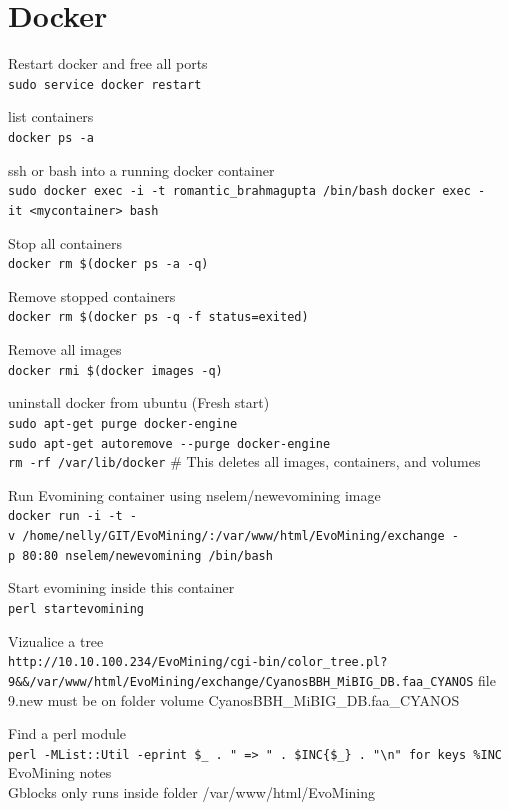 \documentclass[12pt,twoside]{reedthesis}
\begin{document}
  \section{Docker}\label{docker}
  
  Restart docker and free all ports\\
  \texttt{sudo\ service\ docker\ restart}
  
  list containers\\
  \texttt{docker\ ps\ -a}
  
  ssh or bash into a running docker container\\
  \texttt{sudo\ docker\ exec\ -i\ -t\ romantic\_brahmagupta\ /bin/bash}
  \texttt{docker\ exec\ -it\ \textless{}mycontainer\textgreater{}\ bash}
  
  Stop all containers\\
  \texttt{docker\ rm\ \$(docker\ ps\ -a\ -q)}
  
  Remove stopped containers\\
  \texttt{docker\ rm\ \$(docker\ ps\ -q\ -f\ status=exited)}
  
  Remove all images\\
  \texttt{docker\ rmi\ \$(docker\ images\ -q)}
  
  uninstall docker from ubuntu (Fresh start)\\
  \texttt{sudo\ apt-get\ purge\ docker-engine}\\
  \texttt{sudo\ apt-get\ autoremove\ -\/-purge\ docker-engine}\\
  \texttt{rm\ -rf\ /var/lib/docker} \# This deletes all images,
  containers, and volumes
  
  Run Evomining container using nselem/newevomining image\\
  \texttt{docker\ run\ -i\ -t\ -v\ /home/nelly/GIT/EvoMining/:/var/www/html/EvoMining/exchange\ -p\ 80:80\ nselem/newevomining\ /bin/bash}
  
  Start evomining inside this container\\
  \texttt{perl\ startevomining}
  
  Vizualice a tree\\
  \texttt{http://10.10.100.234/EvoMining/cgi-bin/color\_tree.pl?9\&\&/var/www/html/EvoMining/exchange/CyanosBBH\_MiBIG\_DB.faa\_CYANOS}
  file 9.new must be on folder volume CyanosBBH\_MiBIG\_DB.faa\_CYANOS
  
  Find a perl module\\
  \texttt{perl\ -MList::Util\ -e\textquotesingle{}print\ \$\_\ .\ "\ =\textgreater{}\ "\ .\ \$INC\{\$\_\}\ .\ "\textbackslash{}n"\ for\ keys\ \%INC\textquotesingle{}}
  EvoMining notes\\
  Gblocks only runs inside folder /var/www/html/EvoMining
  
\end{document}
